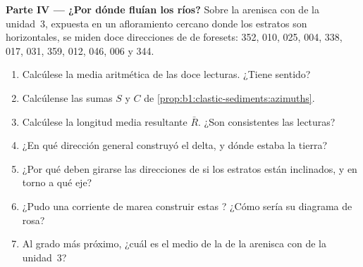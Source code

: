 \begin{problem}
\medskip
\noindent\textbf{Parte IV --- ¿Por dónde fluían los ríos?}
Sobre la arenisca con  de la unidad~3, expuesta en un afloramiento cercano donde los estratos son horizontales, se miden doce direcciones de 
de foresets: 352, 010, 025, 004, 338, 017, 031, 359, 012, 046, 006 y 344.
\begin{enumerate}[resume]
  \item Calcúlese la media aritmética de las doce lecturas. ¿Tiene sentido?
  \item Calcúlense las sumas $S$ y $C$ de \cref{prop:b1:clastic-sediments:azimuths}.
  \item Calcúlese la longitud media resultante $\bar R$. ¿Son consistentes las lecturas?
  \item ¿En qué dirección general construyó el delta, y dónde estaba la tierra?
  \item ¿Por qué deben girarse las direcciones de  si los estratos están inclinados, y en torno a qué eje?
  \item ¿Pudo una corriente de marea construir estas ? ¿Cómo sería su diagrama de rosa?
  \item Al grado más próximo, ¿cuál es el  medio de la  de la arenisca con  de la unidad~3?
\end{enumerate}
\end{problem}
